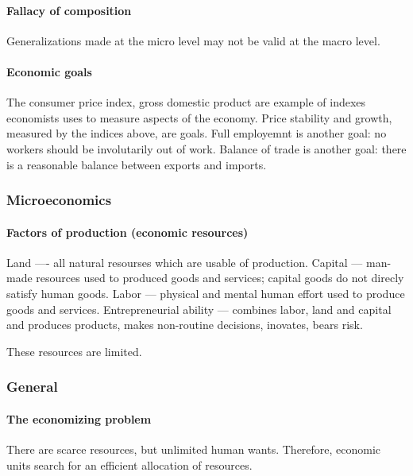 \paragraph{Fallacy of composition}
Generalizations made at the micro level may not be valid at the macro level.

\paragraph{Economic goals}
The consumer price index, gross domestic product are example of indexes economists uses to measure aspects of the economy.
Price stability and growth, measured by the indices above,  are goals.
Full employemnt is another goal: no workers should be involutarily out of work.
Balance of trade is another goal: there is a reasonable balance between exports and imports.

\subsubsection{Microeconomics}

\paragraph{Factors of production (economic resources)}
Land ––- all natural resourses which are usable of production. Capital ---  man-made resources used to produced goods and services; capital goods do not direcly satisfy human goods. Labor --- physical and mental human effort used to produce goods and services. Entrepreneurial ability --- combines labor, land and capital and produces products, makes non-routine decisions, inovates, bears risk.

These resources are limited.

\subsubsection{General}

\paragraph{The economizing problem} There are scarce resources, but unlimited human wants. Therefore, economic units search for an efficient allocation of resources.

